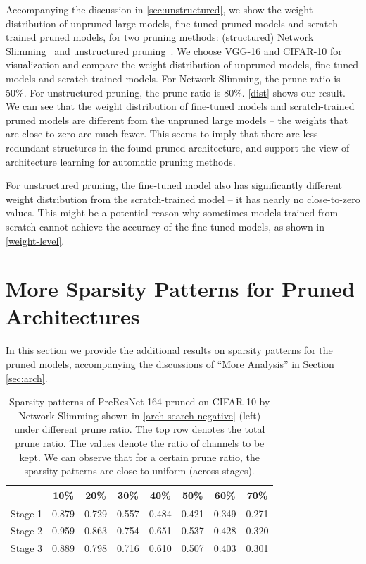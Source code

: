 Accompanying the discussion in \autoref{sec:unstructured}, we show the weight distribution of unpruned large models, fine-tuned pruned models and scratch-trained pruned models, for two pruning methods: (structured) Network Slimming~\citep{liu2017learning} and unstructured pruning~\citep{han2015learning}. We choose VGG-16 and CIFAR-10 for visualization and compare the weight distribution of unpruned models, fine-tuned models and scratch-trained models. For Network Slimming, the prune ratio is 50\%. For unstructured pruning, the prune ratio is 80\%. \autoref{dist} shows our result.  We can see that the weight distribution of fine-tuned models and scratch-trained pruned models are  different from the unpruned large models -- the weights that are close to zero are much fewer.  This seems to imply that there are less redundant structures in the found pruned architecture, and support the view of architecture learning for automatic pruning methods.

For unstructured pruning, the fine-tuned model also has significantly different weight distribution from the scratch-trained model -- it has nearly no close-to-zero values. This might be a potential reason why sometimes  models trained from scratch cannot achieve the accuracy of the fine-tuned models, as shown in \autoref{weight-level}.

\section{More Sparsity Patterns for Pruned Architectures}
\label{sec:additional}
In this section we provide the additional results on sparsity patterns for the pruned models, accompanying the discussions of ``More Analysis'' in Section \ref{sec:arch}.

\setlength{\tabcolsep}{5pt}
\renewcommand{\arraystretch}{1.2}
\begin{table}[!htbp]
\centering
\small
\begin{tabular}{c|ccccccc}
\hline
       & 10\%   & 20\%   & 30\%   & 40\%   & 50\%   & 60\%   & 70\%   \\ \hline
Stage 1 & 0.879 & 0.729 & 0.557 & 0.484 & 0.421 & 0.349 & 0.271 \\
Stage 2 & 0.959 & 0.863 & 0.754 & 0.651 & 0.537 & 0.428 & 0.320 \\
Stage 3 & 0.889 & 0.798 & 0.716 & 0.610 & 0.507 & 0.403 & 0.301 \\ \hline
\end{tabular}
\vspace{1ex}
  \caption{
      Sparsity patterns of PreResNet-164 pruned on CIFAR-10 by Network Slimming  shown in \autoref{arch-search-negative} (left) under different prune ratio. The top row denotes the total prune ratio. The values denote the ratio of channels to be kept. We can observe that for a certain prune ratio, the sparsity patterns are close to uniform (across stages).}
      \label{sparsity-5}
\end{table}


